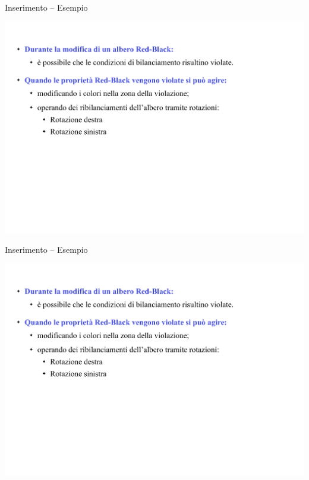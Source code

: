 \begin{frame}{Inserimento -- Esempio}

\includegraphics[width=1.0\textwidth,page=19]{redblack2.pdf}

\end{frame}

\begin{frame}{Inserimento -- Esempio}

\includegraphics[width=1.0\textwidth,page=20]{redblack2.pdf}

\end{frame}

